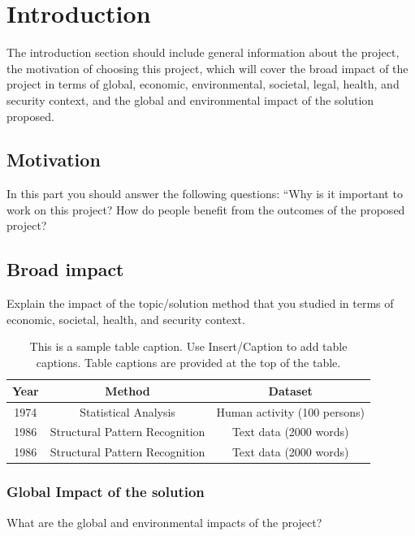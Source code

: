 \documentclass{mefsdp}
\begin{document}
	
	\coverpage
	\descriptivetitle
	
	
	\section{Introduction}
	
	The introduction section should include general information about the project, the motivation of choosing this project, which will cover the broad impact of the project in terms of global, economic, environmental, societal, legal, health, and security context, and the global and environmental impact of the solution proposed. 
	
	\subsection{Motivation}
	
	In this part you should answer the following questions: “Why is it important to work on this project? How do people benefit from the outcomes of the  proposed project?
	
	\subsection{Broad impact}
	
	Explain the impact of the topic/solution method that you studied in terms of economic, societal, health, and security context. 
	
	\begin{table}[h]
		\centering
		\begin{tabular}{| c | c | c |}
			\hline
			\bfseries Year & \bfseries Method & \bfseries Dataset \\
			\hline
			1974 & Statistical Analysis & Human activity (100 persons) \\
			1986 & Structural Pattern Recognition & Text data (2000 words) \\
			1986 & Structural Pattern Recognition & Text data (2000 words) \\
			\hline
		\end{tabular}
	\caption[First sample table]{This is a sample table caption. Use Insert/Caption to add table captions. Table captions are provided at the top of the table.}
	\end{table}
	
	\subsubsection{Global Impact of the solution}
	What are the global and environmental impacts of the project? 
	
\end{document}
